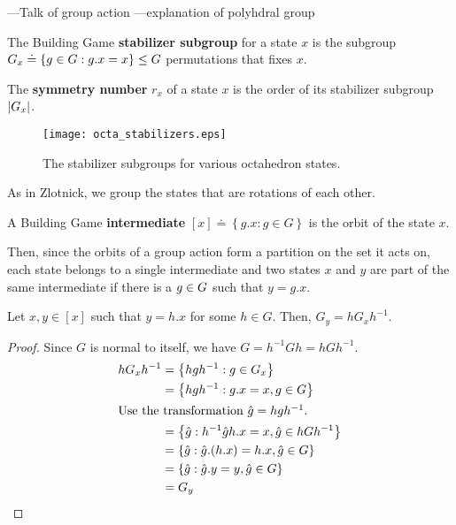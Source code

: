 


---Talk of group action
---explanation of polyhdral group

\begin{mydef}
The Building Game \textbf{stabilizer subgroup} for a state $x$ is the subgroup ${G}_x \doteq \left\{g \in {G} :g. x = x \right\} \leq {G}$ permutations that fixes $x$.
\end{mydef}

\begin{mydef}
The \textbf{symmetry number} $r_x$ of a state $x$ is the order of its stabilizer subgroup $\left|{G}_x\right|$.
\end{mydef}


\begin{figure}[ht]
  \texttt{[image: octa\_stabilizers.eps]}
\caption{The stabilizer subgroups for various octahedron states.}
\label{fig:OctaStabs}
\end{figure}
 




As in Zlotnick, we group the states that are rotations of each other. 

\begin{mydef}
A Building Game \textbf{intermediate} $[x] \doteq \left\{g.x : g \in G\right\}$ is the orbit of the state $x$. 
\end{mydef}
Then, since the orbits of a group action form a partition on the set it acts on, each state belongs to a single intermediate and two states $x$ and $y$ are part of the same intermediate if there is a $g\in{G}$ such that $y = g.x$. 


\begin{mylem}
\label{lem:GyhGxh}
Let $x, y \in \left[x\right]$ such that $y = h.x$ for some $h \in G$. Then, $G_y = hG_xh^{-1}$. 
\end{mylem}
\begin{proof}
Since $G$ is normal to itself, we have $G = h^{-1}Gh = hGh^{-1}$.
\begin{align}
  hG_xh^{-1} &= \left\{hgh^{-1} : g \in G_x \right\} \\
  &= \left\{hgh^{-1} : g.x = x, g \in G\right\} \\
  \intertext{Use the transformation $\hat{g} = hgh^{-1}$.}
  &= \left\{\hat{g} : h^{-1}\hat{g}h.x = x, \hat{g} \in hGh^{-1} \right\} \\ 
  &= \left\{\hat{g} : \hat{g}.(h.x) = h.x, \hat{g} \in G \right\} \\ 
  &= \left\{\hat{g} : \hat{g}.y = y, \hat{g} \in G \right\} \\ 
  &= G_y
\end{align}
\end{proof}

